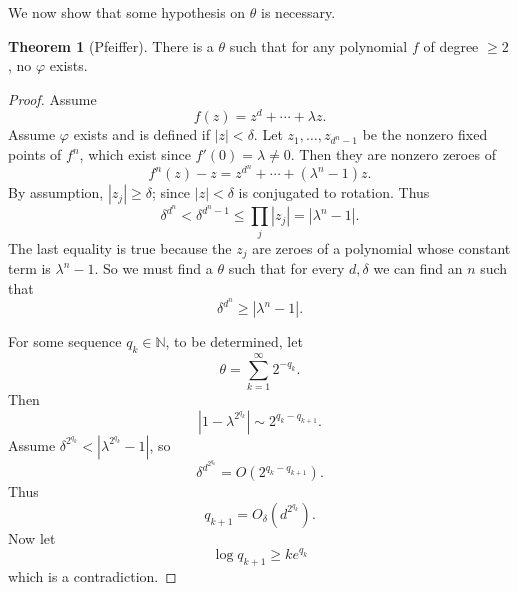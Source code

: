 \documentclass[12pt]{report}
\newcommand{\NN}{\mathbb{N}}
\theoremstyle{definition}
\newtheorem{theorem}{Theorem}[chapter]
\begin{document}
We now show that some hypothesis on $\theta$ is necessary.
\begin{theorem}[Pfeiffer]
There is a $\theta$ such that for any polynomial $f$ of degree $\geq 2$, no $\varphi$ exists.
\end{theorem}
\begin{proof}
Assume
$$f(z) = z^d + \cdots + \lambda z.$$
Assume $\varphi$ exists and is defined if $|z| < \delta$.
Let $z_1, \dots, z_{d^n-1}$ be the nonzero fixed points of $f^n$, which exist since $f'(0) = \lambda \neq 0$.
Then they are nonzero zeroes of
$$f^n(z) - z = z^{d^n} + \cdots + (\lambda^n - 1)z.$$
By assumption, $|z_j| \geq \delta$; since $|z| < \delta$ is conjugated to rotation. Thus
$$\delta^{d^n} < \delta^{d^n - 1} \leq \prod_j |z_j| = |\lambda^n - 1|.$$
The last equality is true because the $z_j$ are zeroes of a polynomial whose constant term is $\lambda^n - 1$.
So we must find a $\theta$ such that for every $d,\delta$ we can find an $n$ such that
$$\delta^{d^n} \geq |\lambda^n - 1|.$$

For some sequence $q_k \in \NN$, to be determined, let
$$\theta = \sum_{k=1}^\infty 2^{-q_k}.$$
Then
$$|1 - \lambda^{2^{q_k}}| \sim 2^{q_k-q_{k+1}}.$$
Assume $\delta^{2^{q_k}} < |\lambda^{2^{q_k}} - 1|$, so
$$\delta^{d^{2^{q_k}}} = O(2^{q_k - q_{k+1}}).$$
Thus
$$q_{k+1} = O_\delta(d^{2^{q_k}}).$$
Now let
$$\log q_{k+1} \geq ke^{q_k}$$
which is a contradiction.
\end{proof}
\end{document}

